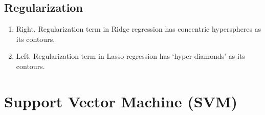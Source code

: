 \documentclass[a4paper, 10pt]{article}
\begin{document}
\subsection{Regularization}
\begin{enumerate}[label=(\alph*)]
    \item Right. Regularization term in Ridge regression has concentric hyperspheres as its contours.
    \item Left. Regularization term in Lasso regression has `hyper-diamonds' as its contours.
\end{enumerate}

\clearpage

\section{Support Vector Machine (SVM)}
\end{document}
